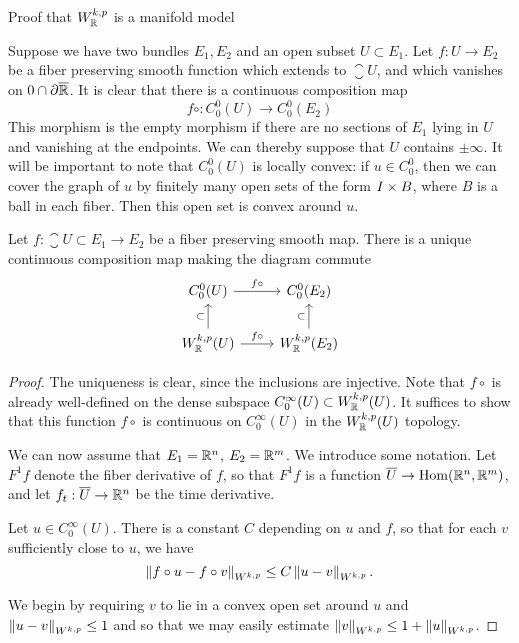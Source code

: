 \documentclass{amsart}
\begin{document}
\begin{clear}{Proof that $W^{k,p}_{\mathbb{R}}$ is a manifold model}
\begin{defn}
  Suppose we have two bundles $E_{1},E_{2}$ and an open subset
  $U\subset E_{1}$. Let $f:U\to E_{2}$ be a fiber preserving smooth
  function which extends to $\closure{U}$, and which vanishes on
  $0\cap \partial\overline{\mathbb{R}}$. It is clear that there is a continuous composition map
  \begin{equation*}
    f\circ : C^{0}_{0}(U)\to C^{0}_{0}(E_{2})
  \end{equation*}
  This morphism is the empty morphism if there are no sections of $E_{1}$ lying in $U$ and vanishing at the endpoints. We can thereby suppose that $U$ contains $\pm\infty$. It will be important to note that $C^{0}_{0}(U)$ is locally convex: if $u\in C^{0}_{0}$, then we can cover the graph of $u$ by finitely many open sets of the form $I\times B$, where $B$ is a ball in each fiber. Then this open set is convex around $u$. 
\end{defn}
\begin{lemma}
  Let $f:\closure{U}\subset E_{1}\to E_{2}$ be a fiber preserving smooth map. There is a unique continuous composition map making the diagram commute
  \begin{equation*}
    \begin{tikzcd}
      C^{0}_{0}(U)\arrow[r,"f\circ "]&C^{0}_{0}(E_{2})\\
      W^{k,p}_{\R}(U)\arrow[u,"\subset"]\arrow[r,"f\circ"]&W^{k,p}_{\R}(E_{2})\arrow[u,"\subset"]
    \end{tikzcd}
  \end{equation*}  
\end{lemma}
\begin{proof}
  The uniqueness is clear, since the inclusions are injective. Note that $f\circ$ is already well-defined on the dense subspace $C^{\infty}_{0}(U)\subset W^{k,p}_{\mathbb{R}}(U)$. It suffices to show that this function $f\circ $ is continuous on $C^{\infty}_{0}(U)$ in the $W^{k,p}_{\mathbb{R}}(U)$ topology. 

  We can now assume that $E_{1}=\mathbb{R}^{n}$, $E_{2}=\mathbb{R}^{m}$. We introduce some notation. Let $F^{1}f$ denote the fiber derivative of $f$, so that $F^{1}f$ is a function $\overline{U}\to \operatorname{\mathrm{Hom}}(\mathbb{R}^{n},\mathbb{R}^{m})$, and let $f_{t}:\overline{U}\to \mathbb{R}^{n}$ be the time derivative.
  \begin{claim}
    Let $u\in C^{\infty}_{0}(U)$. There is a constant $C$ depending on $u$ and $f$, so that for each $v$ sufficiently close to $u$, we have
    \begin{equation*}
      \left\lVert f\circ u-f\circ v\right\rVert_{W^{k,p}}\le C\left\lVert u-v\right\rVert_{W^{k,p}}.
    \end{equation*}
  \end{claim}
    We begin by requiring $v$ to lie in a convex open set around $u$ and $\left\lVert u-v\right\rVert_{W^{k,p}}\le 1$ and so that we may easily estimate $\left\lVert v\right\rVert_{W^{k,p}}\le 1+\left\lVert u\right\rVert_{W^{k,p}}$.


\end{proof}
\end{clear}
\end{document}

